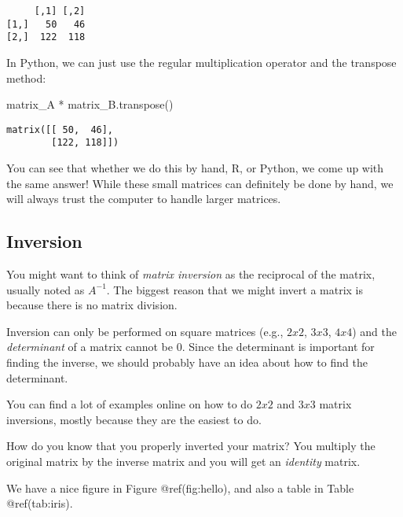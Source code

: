 \documentclass[
]{krantz}
\newenvironment{Shaded}{\begin{snugshade}}{\end{snugshade}}
\newcommand{\NormalTok}[1]{\textcolor[rgb]{0.00,0.23,0.31}{#1}}
\newcommand{\OperatorTok}[1]{\textcolor[rgb]{0.37,0.37,0.37}{#1}}
\begin{document}
\begin{verbatim}
     [,1] [,2]
[1,]   50   46
[2,]  122  118
\end{verbatim}

In Python, we can just use the regular multiplication operator and the
transpose method:

\begin{Shaded}
\begin{Highlighting}[]
\NormalTok{matrix\_A }\OperatorTok{*}\NormalTok{ matrix\_B.transpose()}
\end{Highlighting}
\end{Shaded}

\begin{verbatim}
matrix([[ 50,  46],
        [122, 118]])
\end{verbatim}

You can see that whether we do this by hand, R, or Python, we come up
with the same answer! While these small matrices can definitely be done
by hand, we will always trust the computer to handle larger matrices.

\hypertarget{inversion}{%
\subsection{Inversion}\label{inversion}}

You might want to think of \emph{matrix inversion} as the reciprocal of
the matrix, usually noted as \(A^{-1}\). The biggest reason that we
might invert a matrix is because there is no matrix division.

Inversion can only be performed on square matrices (e.g., \(2x2\),
\(3x3\), \(4x4\)) and the \emph{determinant} of a matrix cannot be 0.
Since the determinant is important for finding the inverse, we should
probably have an idea about how to find the determinant.

You can find a lot of examples online on how to do \(2x2\) and \(3x3\)
matrix inversions, mostly because they are the easiest to do.

How do you know that you properly inverted your matrix? You multiply the
original matrix by the inverse matrix and you will get an
\emph{identity} matrix.

We have a nice figure in Figure @ref(fig:hello), and also a table in
Table @ref(tab:iris).
\end{document}

